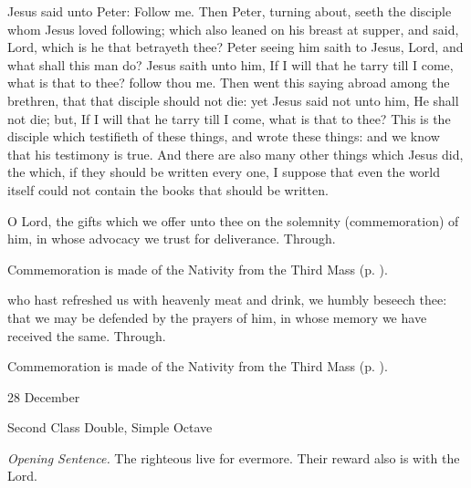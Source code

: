  Jesus said unto Peter: Follow me. Then Peter, turning about, seeth the disciple whom Jesus loved following; which also leaned on his breast at supper, and said, Lord, which is he that betrayeth thee? Peter seeing him saith to Jesus, Lord, and what shall this man do? Jesus saith unto him, If I will that he tarry till I come, what is that to thee? follow thou me. Then went this saying abroad among the brethren, that that disciple should not die: yet Jesus said not unto him, He shall not die; but, If I will that he tarry till I come, what is that to thee? This is the disciple which testifieth of these things, and wrote these things: and we know that his testimony is true. And there are also many other things which Jesus did, the which, if they should be written every one, I suppose that even the world itself could not contain the books that should be written.

\vspace{-1ex}

\secret
{} O Lord, the gifts which we offer unto thee on the solemnity (commemoration) of him, in whose advocacy we trust for deliverance. Through.
\begin{rubric}
    Commemoration is made of the Nativity from the Third Mass (p. \pageref{NativityMassIIISecret}).
\end{rubric}
\postcommunion
{} who hast refreshed us with heavenly meat and drink, we humbly beseech thee: that we may be defended by the prayers of him, in whose memory we have received the same. Through.
\begin{rubric}
    Commemoration is made of the Nativity from the Third Mass (p. \pageref{NativityMassIIIPostcommunion}).
\end{rubric}


\begin{inhead}
{28 December}\par
{Second Class Double, Simple Octave}
\end{inhead}
\par\noindent
\textit{Opening Sentence.} The righteous live for evermore. Their reward also is with the Lord.

